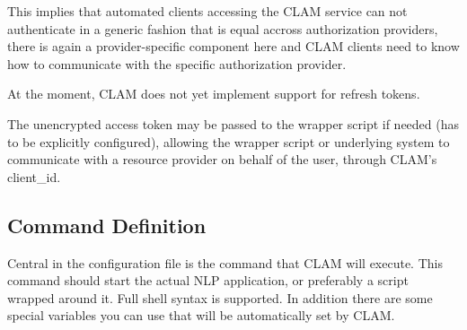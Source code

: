\documentclass[a4paper,12pt]{report}
\begin{document}
This implies that automated clients accessing the CLAM service can not
authenticate in a generic fashion that is equal accross authorization
providers, there is again a provider-specific component here and CLAM clients
need to know how to communicate with the specific authorization provider.

At the moment, CLAM does not yet implement support for refresh tokens.

The unencrypted access token may be passed to the wrapper script if needed (has
to be explicitly configured), allowing the wrapper script or underlying system
to communicate with a resource provider on behalf of the user, through CLAM's
client\_id.

\subsection{Command Definition} \label{sec:command}

Central in the configuration file is the command that CLAM will execute. This
command should start the actual NLP application, or preferably a script wrapped
around it. Full shell syntax is supported. In addition there are some special
variables you can use that will be automatically set by CLAM. 
\end{document}

